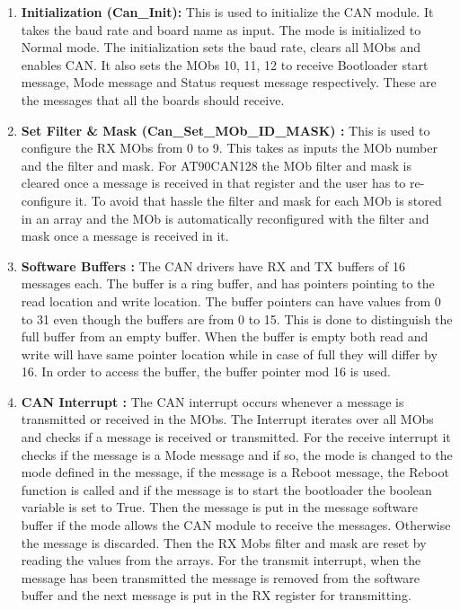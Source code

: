 \begin{enumerate}
\item \textbf{Initialization (Can\_Init):} This is used to initialize the CAN module. It takes the baud rate and board name as input. The mode is initialized to Normal mode. The initialization sets the baud rate, clears all MObs and enables CAN. It also sets the MObs 10, 11, 12 to receive Bootloader start message, Mode message and Status request message respectively. These are the messages that all the boards should receive.
\item \textbf{Set Filter \& Mask (Can\_Set\_MOb\_ID\_MASK) :} This is used to configure the RX MObs from 0 to 9. This takes as inputs the MOb number and the filter and mask. For AT90CAN128 the MOb filter and mask is cleared once a message is received in that register and the user has to re-configure it. To avoid that hassle the filter and mask for each MOb is stored in an array and the MOb is automatically reconfigured with the filter and mask once a message is received in it.
\item \textbf{Software Buffers :} The CAN drivers have RX and TX buffers of 16 messages each. The buffer is a ring buffer, and has pointers pointing to the read location and write location. The buffer pointers can have values from 0 to 31 even though the buffers are from 0 to 15. This is done to distinguish the full buffer from an empty buffer. When the buffer is empty both read and write will have same pointer location while in case of full they will differ by 16. In order to access the buffer, the buffer pointer mod 16 is used. 
\item \textbf{CAN Interrupt :} The CAN interrupt occurs whenever a message is transmitted or received in the MObs. The Interrupt iterates over all MObs and checks if a message is received or transmitted. \newline
For the receive interrupt it checks if the message is a Mode message and if so, the mode is changed to the mode defined in the message, if the message is a Reboot message, the Reboot function is called and if the message is to start the bootloader the boolean variable is set to True. Then the message is put in the message software buffer if the mode allows the CAN module to receive the messages. Otherwise the message is discarded. Then the RX Mobs filter and mask are reset by reading the values from the arrays.\newline
For the transmit interrupt, when the message has been transmitted the message is removed from the software buffer and the next message is put in the RX register for transmitting.

\end{enumerate}
